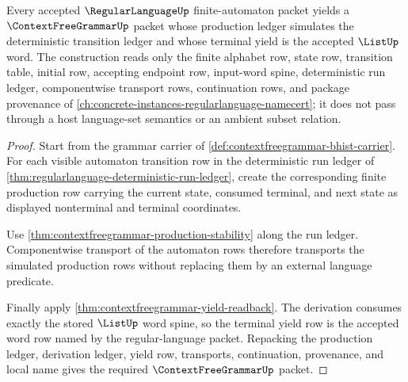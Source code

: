 \begin{theorem}
\label{thm:contextfreegrammar-regularlanguage-inclusion-certificate}
Every accepted $\RegularLanguageUp$ finite-automaton packet yields a $\ContextFreeGrammarUp$ packet whose production ledger simulates the deterministic transition ledger and whose terminal yield is the accepted $\ListUp$ word. The construction reads only the finite alphabet row, state row, transition table, initial row, accepting endpoint row, input-word spine, deterministic run ledger, componentwise transport rows, continuation rows, and package provenance of \autoref{ch:concrete-instances-regularlanguage-namecert}; it does not pass through a host language-set semantics or an ambient subset relation.
\end{theorem}
\begin{proof}
Start from the grammar carrier of \autoref{def:contextfreegrammar-bhist-carrier}. For each visible automaton transition row in the deterministic run ledger of \autoref{thm:regularlanguage-deterministic-run-ledger}, create the corresponding finite production row carrying the current state, consumed terminal, and next state as displayed nonterminal and terminal coordinates.

Use \autoref{thm:contextfreegrammar-production-stability} along the run ledger. Componentwise transport of the automaton rows therefore transports the simulated production rows without replacing them by an external language predicate.

Finally apply \autoref{thm:contextfreegrammar-yield-readback}. The derivation consumes exactly the stored $\ListUp$ word spine, so the terminal yield row is the accepted word row named by the regular-language packet. Repacking the production ledger, derivation ledger, yield row, transports, continuation, provenance, and local name gives the required $\ContextFreeGrammarUp$ packet.
\end{proof}

